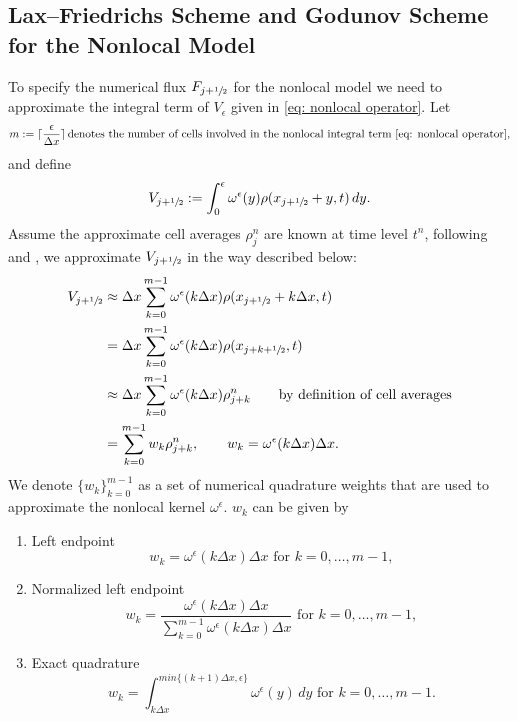 \subsection{Lax--Friedrichs Scheme and Godunov Scheme for the Nonlocal Model}
To specify the numerical flux $F_{j+\sfrac{1}{2}}$ for the nonlocal model we need to approximate the integral term of $V_{\epsilon}$ given in \eqref{eq: nonlocal operator}.
Let
\[m:=\lceil \frac{\epsilon}{\Delta x}\rceil \, \text{denotes the number of cells involved in the nonlocal integral term \eqref{eq: nonlocal operator}}, \]
and define
\[
    V_{j+\sfrac12}:= \int_{0}^{\epsilon} \omega^{\epsilon}(y) \rho(x_{j+\sfrac12}+y,t) \, dy.
\]
Assume the approximate cell averages $\rho_{j}^{n}$ are known at time level $t^{n}$, following \cite{blandinWellposednessConservationLaw2016} and \cite{huangAsymptoticCompatibilityClass2024}, we approximate $V_{j+\sfrac12}$ in the way described below:
\begin{align*}
    V_{j+\sfrac12} & \approx \Delta x \sum_{k=0}^{m-1} \omega^{\epsilon}(k\Delta x) \rho(x_{j+\sfrac12}+k\Delta x,t)                             \\
                   & =\Delta x \sum_{k=0}^{m-1} \omega^{\epsilon}(k\Delta x) \rho({x_{j+k +\sfrac{1}{2}},t})                                     \\
                   & \approx \Delta x \sum_{k=0}^{m-1} \omega^{\epsilon}(k\Delta x) \rho_{j+k}^{n}  \qquad \text{by definition of cell averages} \\
                   & =  \sum_{k=0}^{m-1} w_k \rho_{j+k}^{n},  \qquad w_k= \omega^{\epsilon}(k\Delta x)\Delta x.
\end{align*}
We denote $\{ w_k \}_{k= 0}^{m-1}$ as a set of numerical quadrature weights that are used to approximate the nonlocal kernel $\omega^{\epsilon}$. $w_k$ can be given by

\begin{enumerate}
    \item Left endpoint
          \begin{equation}\label{eq:left_endpoint-quadrature}
              w_k = \omega^{\epsilon}(k\Delta x)\Delta x \text{ for $k = 0, \dots, m-1$},
          \end{equation}
    \item Normalized left endpoint
          \begin{equation}\label{eq:normalized_left_endpoint_quadrature}
              w_k = \frac{\omega^{\epsilon}(k\Delta x)\Delta x}{\sum_{k=0}^{m-1} \omega^{\epsilon}(k\Delta x)\Delta x}  \text{ for $k = 0, \dots, m-1$},
          \end{equation}
    \item  Exact quadrature
          \begin{equation}\label{eq:exact_quadrature}
              w_k = \int_{k\Delta x}^{min\{(k+1)\Delta x,\epsilon \}}\omega^{\epsilon}(y) \,dy \text{ for $k = 0, \dots, m-1$}.
          \end{equation}
\end{enumerate}

